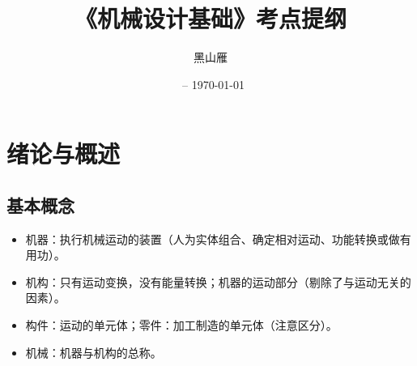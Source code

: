 \documentclass[12pt,a4paper]{article}
\title{《机械设计基础》考点提纲}
\date{\beginday\ -- \today}
\author{黑山雁}
\newcommand{\tightlist}{\setlength{\parskip}{0pt}\setlength{\itemsep}{0pt}}
\newcommand{\hint}[1]{\textsf{（#1）}}
\newcommand{\minor}[1]{{\color{gray} #1}}
\begin{document}
\maketitle

\section{绪论与概述}
\subsection{基本概念}
\begin{itemize}\tightlist
    \item 机器：执行机械运动的装置\hint{人为实体组合、确定相对运动、功能转换或做有用功}。
    \item 机构：只有运动变换，没有能量转换；机器的运动部分\hint{剔除了与运动无关的因素}。
    \item 构件：运动的单元体；零件：加工制造的单元体\hint{注意区分}。
    \item \minor{机械：机器与机构的总称。}
\end{itemize}
\end{document}
